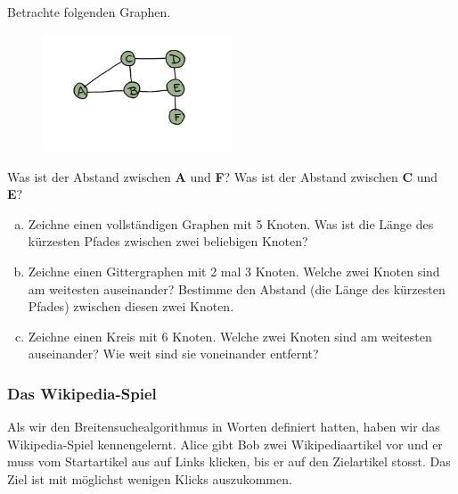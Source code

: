 \begin{aufgabe}\label{aufgabe_abstand_ex}
Betrachte folgenden Graphen.
\begin{figure}[H]
    \centering
    \includegraphics[width=0.5\textwidth]{Pictures/SP/abstand_ex.png} 
    \label{fig:abstand_ex}
\end{figure}
Was ist der Abstand zwischen \textbf{A} und \textbf{F}?
Was ist der Abstand zwischen \textbf{C} und \textbf{E}?
\end{aufgabe}
\begin{aufgabe}\label{aufgabe_abstand}
\begin{enumerate}[(a)]
\item \label{aufgabe_abstand_k5} Zeichne einen vollständigen Graphen mit 5 Knoten. Was ist die Länge des kürzesten Pfades zwischen zwei beliebigen Knoten?
\item \label{aufgabe_abstand_gitter23} Zeichne einen Gittergraphen mit 2 mal 3 Knoten. Welche zwei Knoten sind am weitesten auseinander? Bestimme den Abstand (die Länge des kürzesten Pfades) zwischen diesen zwei Knoten.
\item \label{aufgabe_abstand_kreis6} Zeichne einen Kreis mit 6 Knoten. Welche zwei Knoten sind am weitesten auseinander? Wie weit sind sie voneinander entfernt?
\end{enumerate}
\end{aufgabe}

\subsubsection*{Das Wikipedia-Spiel}
Als wir den Breitensuchealgorithmus in Worten definiert hatten, haben wir das Wikipedia-Spiel kennengelernt. Alice gibt Bob zwei Wikipediaartikel vor und er muss vom Startartikel aus auf Links klicken, bis er auf den Zielartikel stosst. Das Ziel ist mit möglichst wenigen Klicks auszukommen.

